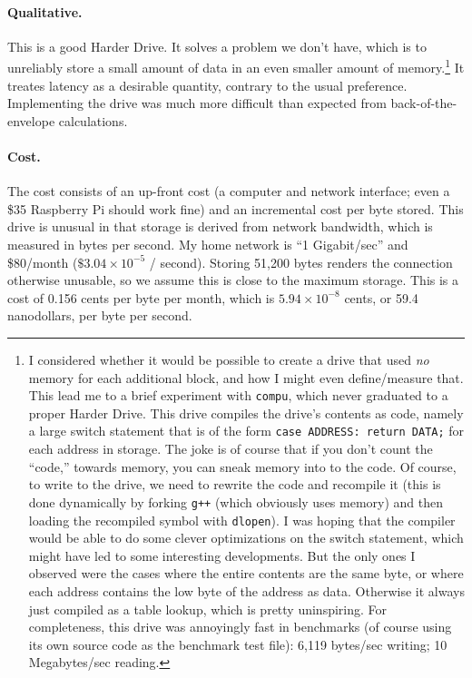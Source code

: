 \documentclass[twocolumn]{article}
\begin{document}
\paragraph{Qualitative.} This is a good Harder Drive. It solves
a problem we don't have, which is to unreliably store a small amount
of data in an even smaller amount of memory.\!\footnote{
  I considered whether it would be possible to create a drive
  that used {\em no} memory for each additional block, and how
  I might even define/measure that. This lead me to a brief experiment
  with {\tt compu}, which never graduated to a proper Harder Drive.
  This drive compiles the drive's contents as code, namely a
  large switch statement that is of the form \verb+case ADDRESS: return DATA;+
  for each address in storage. The joke is of course that if you
  don't count the ``code,'' towards memory, you can sneak memory
  into to the code. Of course, to write to the drive, we need to
  rewrite the code and recompile it (this is done dynamically by
  forking \verb|g++| (which obviously uses memory) and then
  loading the recompiled symbol with \verb|dlopen|). I was
  hoping that the compiler would be able to do some clever
  optimizations on the switch statement, which might have led
  to some interesting developments. But the only ones I observed
  were the cases where the entire contents are the same byte,
  or where each address contains the low byte of the address
  as data. Otherwise it always just compiled as a table lookup,
  which is pretty uninspiring. For completeness, this drive
  was annoyingly fast in benchmarks (of course using its own
  source code as the benchmark test file): 6,119 bytes/sec
  writing; 10 Megabytes/sec reading.
  } It treates latency as a
desirable quantity, contrary to the usual preference. Implementing the
drive was much more difficult than expected from back-of-the-envelope
calculations.

\paragraph{Cost.} The cost consists of an up-front cost (a computer
and network interface; even a \$35 Raspberry Pi should work fine) and
an incremental cost per byte stored. This drive is unusual in that
storage is derived from network bandwidth, which is measured in bytes
per second. My home network is ``1 Gigabit/sec'' and \$80/month
($\$3.04 \times 10^{-5}$ / second). Storing 51,200 bytes renders the
connection otherwise unusable, so we assume this is close to the
maximum storage. This is a cost of 0.156 cents per byte per month,
which is $5.94 \times 10^{-8}$ cents, or 59.4 nanodollars, per byte
per second.
\end{document}
